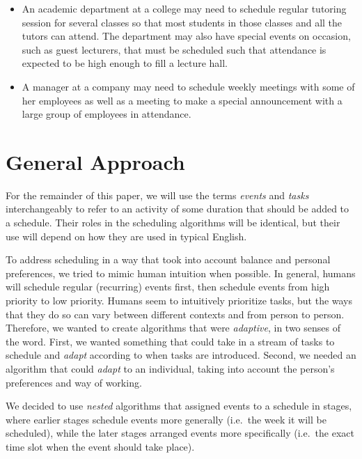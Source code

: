 \documentclass{article}
\newcommand{\todo}[1]{}
\begin{document}
\begin{itemize}
	\item 	
	 	An academic department at a college may need to schedule regular tutoring session for several classes so that most students in those classes and all the tutors can attend. The department may also have special events on occasion, such as guest lecturers, that must be scheduled such that attendance is expected to be high enough to fill a lecture hall.
	\item	
	 	A manager at a company may need to schedule weekly meetings with some of her employees as well as a meeting to make a special announcement with a large group of employees in attendance.
	\end{itemize}

\section{General Approach}
	For the remainder of this paper, we will use the terms \emph{events} and \emph{tasks} interchangeably to refer to an activity of some duration that should be added to a schedule.
	Their roles in the scheduling algorithms will be identical, but their use will depend on how they are used in typical English.

	To address scheduling in a way that took into account balance and personal preferences, we tried to mimic human intuition when possible.
	In general, humans will schedule regular (recurring) events first, then schedule events from high priority to low priority.\todo{CITE THIS: psychology}
	Humans seem to intuitively prioritize tasks, but the ways that they do so can vary between different contexts and from person to person.
	Therefore, we wanted to create algorithms that were \emph{adaptive}, in two senses of the word.
	First, we wanted something that could take in a stream of tasks to schedule and \emph{adapt} according to when tasks are introduced.
	Second, we needed an algorithm that could \emph{adapt} to an individual, taking into account the person's preferences and way of working.

	We decided to use \emph{nested} algorithms that assigned events to a schedule in stages, where earlier stages schedule events more generally (i.e.~the week it will be scheduled), while the later stages arranged events more specifically (i.e.~the exact time slot when the event should take place).
\end{document}

